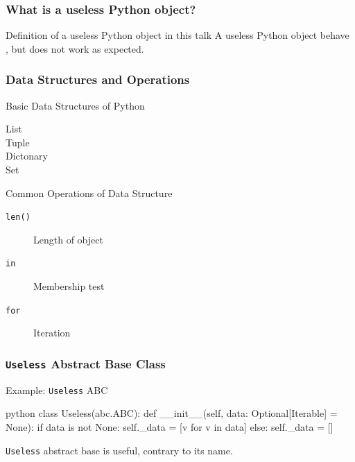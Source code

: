 \documentclass[aspectratio=169,dvipdfmx,12pt,notheorems]{beamer}
\theoremstyle{definition}
\begin{document}
\begin{frame}\frametitle{What is a useless Python object?}

\begin{block}{Definition of a useless Python object in this talk}
A useless Python object behave , but does not work as expected.
\end{block}

\end{frame}

\begin{frame}[fragile]\frametitle{Data Structures and Operations}

\begin{exampleblock}{Basic Data Structures of Python}
\begin{description}
\item[List] \pyv{[1, 2, 3, 4, 5]}
\item[Tuple] 
\item[Dictonary] 
\item[Set] 
\end{description}
\end{exampleblock}

\begin{exampleblock}{Common Operations of Data Structure}
\begin{description}
\item[\texttt{len()}] Length of object
\item[\texttt{in}] Membership test
\item[\texttt{for}] Iteration
\end{description}
\end{exampleblock}

\end{frame}

\begin{frame}[fragile]\frametitle{\texttt{Useless} Abstract Base Class}

\begin{exampleblock}{Example: \texttt{Useless} ABC}
\begin{pygments}{python}
class Useless(abc.ABC):
    def __init__(self, data: Optional[Iterable] = None):
        if data is not None:
            self._data = [v for v in data]
        else:
            self._data = []
\end{pygments}
\end{exampleblock}
\texttt{Useless} abstract base is useful, contrary to its name.
\end{frame}
\end{document}
